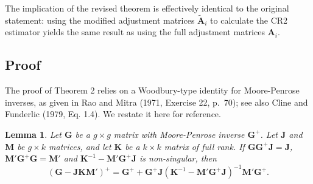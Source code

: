 \documentclass[12pt]{article}
\newtheorem{lem}{Lemma}
\begin{document}
The implication of the revised theorem is effectively identical to the
original statement: using the modified adjustment matrices
\(\tilde{\mathbf{A}}_i\) to calculate the CR2 estimator yields the same
result as using the full adjustment matrices \(\mathbf{A}_i\).

\hypertarget{proof}{%
\subsection{Proof}\label{proof}}

The proof of Theorem 2 relies on a Woodbury-type identity for
Moore-Penrose inverses, as given in Rao and Mitra (1971, Exercise 22,
p.~70); see also Cline and Funderlic (1979, Eq. 1.4). We restate it here
for reference.

\begin{lem}
\label{lemma}
Let $\mathbf{G}$ be a $g \times g$ matrix with Moore-Penrose inverse $\mathbf{G}^+$. Let $\mathbf{J}$ and $\mathbf{M}$ be $g \times k$ matrices, and let $\mathbf{K}$ be a $k \times k$ matrix of full rank. If $\mathbf{G} \mathbf{G}^+ \mathbf{J} = \mathbf{J}$, $\mathbf{M}' \mathbf{G}^+ \mathbf{G} = \mathbf{M}'$ and $\mathbf{K}^{-1} - \mathbf{M}' \mathbf{G}^+ \mathbf{J}$ is non-singular, then
\begin{equation}
\left(\mathbf{G} - \mathbf{J} \mathbf{K} \mathbf{M}'\right)^+ = \mathbf{G}^+ + \mathbf{G}^+ \mathbf{J}\left( \mathbf{K}^{-1} - \mathbf{M}' \mathbf{G}^+ \mathbf{J}\right)^{-1} \mathbf{M}'\mathbf{G}^+.
\end{equation}
\end{lem}
\end{document}
